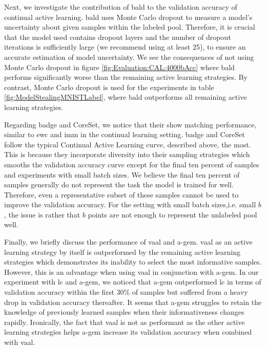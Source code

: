 Next, we investigate the contribution of \gls{bald} to the validation accuracy of continual active learning. \gls{bald} uses Monte Carlo dropout to measure a 
model's uncertainty about given samples within the labeled pool. Therefore, it is crucial that the model used contains dropout layers and the number of dropout 
iterations is sufficiently large (we recommend using at least 25), to ensure an accurate estimation of model uncertainty. We see the consequences of 
not using Monte Carlo dropout in figure \ref{fig:Evaluation:CAL:4000bAcc} where \gls{bald} performs significantly worse than the remaining active learning
strategies. By contrast, Monte Carlo dropout is used for the experiments in table \ref{fig:ModelStealingMNISTLabel}, where \gls{bald} outperforms all remaining
active learning strategies. \par
Regarding \gls{badge} and CoreSet, we notice that their show matching performance, similar to \gls{ewc} and \gls{imm} in the continual learning setting. \gls{badge}
and CoreSet follow the typical Continual Active Learning curve, described above, the most. This is because they incorporate diversity into their
sampling strategies which smooths the validation accuracy curve except for the final ten percent of samples and experiments with small batch sizes. We believe the
final ten percent of samples generally do not represent the task the model is trained for well. Therefore, even a representative subset of these samples cannot
be used to improve the validation accuracy. For the setting with small batch sizes,i.e. small $b$, the issue is rather that $b$ points are not enough to represent
the unlabeled pool well. \par
Finally, we briefly discuss the performance of \gls{vaal} and \gls{a-gem}. \gls{vaal} as an active learning strategy by itself is outperformed by the remaining active
learning strategies which demonstrates its inability to select the most informative samples. However, this is an advantage when using \gls{vaal} in conjunction
with \gls{a-gem}. In our experiment with \gls{lc} and \gls{a-gem}, we noticed that \gls{a-gem} outperformed \gls{lc} in terms of validation accuracy within the first 30\%
of samples but suffered from a heavy drop in validation accuracy thereafter. It seems that \gls{a-gem} struggles to retain the knowledge of previously learned samples when
their informativeness changes rapidly. Ironically, the fact that \gls{vaal} is not as performant as the other active learning strategies helps \gls{a-gem} increase its
validation accuracy when combined with \gls{vaal}. \par

